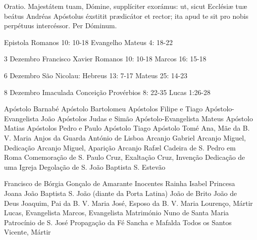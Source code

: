 Oratio.
Majestátem tuam, Dómine, supplíciter exorámus: ut, sicut Ecclésiæ tuæ beátus Andréas Apóstolus éxstitit prædicátor et rector; ita apud te sit pro nobis perpétuus intercéssor. Per Dóminum.

Epistola Romanos 10: 10-18
Evangelho Mateus 4: 18-22


3 Dezembro
Francisco Xavier Romanos 10: 10-18 Marcos 16: 15-18

6 Dezembro
São Nicolau: Hebreus 13: 7-17 Mateus 25: 14-23

8 Dezembro
Imaculada Conceição Provérbios 8: 22-35 Lucas 1:26-28

Apóstolo Barnabé
Apóstolo Bartolomeu
Apóstolos Filipe e Tiago
Apóstolo-Evangelista João
Apóstolos Judas e Simão
Apóstolo-Evangelista Mateus
Apóstolo Matias
Apóstolos Pedro e Paulo
Apóstolo Tiago
Apóstolo Tomé
Ana, Mãe da B. V. Maria
Anjos da Guarda
António de Lisboa
Arcanjo Gabriel
Arcanjo Miguel, Dedicação
Arcanjo Miguel, Aparição
Arcanjo Rafæl
Cadeira de S. Pedro em Roma
Comemoração de S. Paulo
Cruz, Exaltação
Cruz, Invenção
Dedicação de uma Igreja
Degolação de S. João Baptista
S. Estevão

Francisco de Bórgia
Gonçalo de Amarante
Inocentes
Rainha Isabel
Princesa Joana
João Baptista
S. João (diante da Porta Latina)
João de Brito
João de Deus
Joaquim, Pai da B. V. Maria
José, Esposo da B. V. Maria
Lourenço, Mártir
Lucas, Evangelista
Marcos, Evangelista
Matrimónio
Nuno de Santa Maria
Patrocínio de S. José
Propagação da Fé
Sancha e Mafalda
Todos os Santos
Vicente, Mártir
